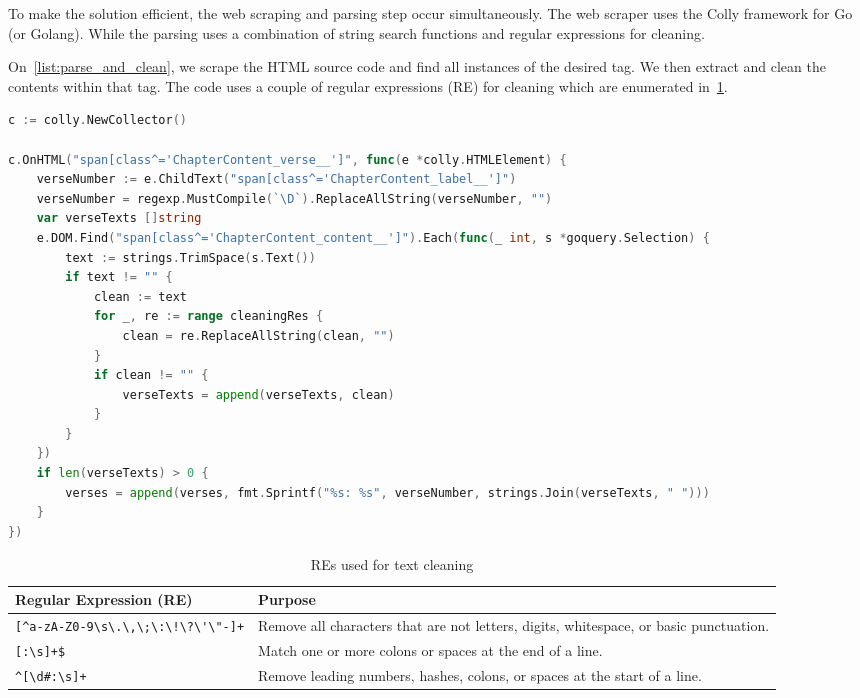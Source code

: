 \documentclass{article}
\begin{document}
To make the solution efficient, the web scraping and parsing step occur
simultaneously. The web scraper uses the Colly framework for Go (or Golang).
While the parsing uses a combination of string search functions and regular
expressions for cleaning.

On~\cref{list:parse_and_clean}, we scrape the HTML source code and find all
instances of the desired tag. We then extract and clean the contents within
that tag. The code uses a couple of regular expressions (RE) for cleaning which
are enumerated in~\cref{tab:regex}.

\begin{lstlisting}[language=Go, caption={Parsing and Cleaning Step}, label={list:parse_and_clean}]
c := colly.NewCollector()

c.OnHTML("span[class^='ChapterContent_verse__']", func(e *colly.HTMLElement) {
    verseNumber := e.ChildText("span[class^='ChapterContent_label__']")
    verseNumber = regexp.MustCompile(`\D`).ReplaceAllString(verseNumber, "")
    var verseTexts []string
    e.DOM.Find("span[class^='ChapterContent_content__']").Each(func(_ int, s *goquery.Selection) {
        text := strings.TrimSpace(s.Text())
        if text != "" {
            clean := text
            for _, re := range cleaningRes {
                clean = re.ReplaceAllString(clean, "")
            }
            if clean != "" {
                verseTexts = append(verseTexts, clean)
            }
        }
    })
    if len(verseTexts) > 0 {
        verses = append(verses, fmt.Sprintf("%s: %s", verseNumber, strings.Join(verseTexts, " ")))
    }
})
\end{lstlisting}

\begin{table}[h!]
    \centering
    \begin{tabular}{p{} p{}}
        \hline
        \textbf{Regular Expression (RE)}        & \textbf{Purpose}                                                                      \\
        \hline
        \verb|[^a-zA-Z0-9\s\.\,\;\:\!\?\'\"-]+| & Remove all characters that are not letters, digits, whitespace, or basic punctuation. \\
        \verb|[:\s]+$|                          & Match one or more colons or spaces at the end of a line.                              \\
        \verb|^[\d#:\s]+|                       & Remove leading numbers, hashes, colons, or spaces at the start of a line.             \\
        \hline
    \end{tabular}
    \caption{REs used for text cleaning}\label{tab:regex}
\end{table}
\end{document}
